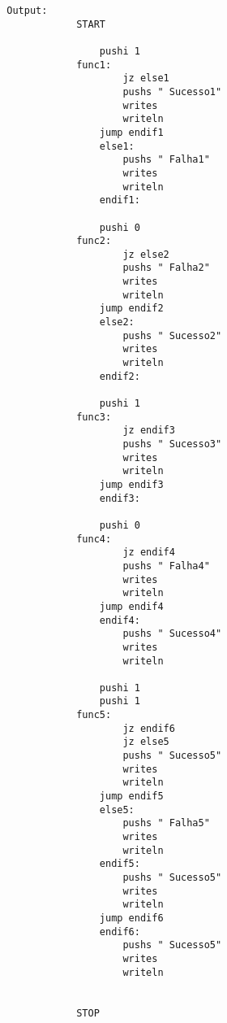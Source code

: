 \documentclass{article}
\begin{document}
        
        \begin{verbatim}
        Output: 			
                    START
                    
                    	pushi 1
                    func1:
                    		jz else1
                    		pushs " Sucesso1"
                    		writes 
                    		writeln 
                    	jump endif1
                    	else1:
                    		pushs " Falha1"
                    		writes 
                    		writeln 
                    	endif1:
                    	
                    	pushi 0
                    func2:
                    		jz else2
                    		pushs " Falha2"
                    		writes 
                    		writeln 
                    	jump endif2
                    	else2:
                    		pushs " Sucesso2"
                    		writes 
                    		writeln 
                    	endif2:
                    	
                    	pushi 1
                    func3:
                    		jz endif3
                    		pushs " Sucesso3"
                    		writes 
                    		writeln 
                    	jump endif3
                    	endif3:
                    	
                    	pushi 0
                    func4:
                    		jz endif4
                    		pushs " Falha4"
                    		writes 
                    		writeln 
                    	jump endif4
                    	endif4:
                    		pushs " Sucesso4"
                    		writes 
                    		writeln 
                    	
                    	pushi 1
                    	pushi 1
                    func5:
                    		jz endif6
                    		jz else5
                    		pushs " Sucesso5"
                    		writes 
                    		writeln 
                    	jump endif5
                    	else5:
                    		pushs " Falha5"
                    		writes 
                    		writeln 
                    	endif5:
                    		pushs " Sucesso5"
                    		writes 
                    		writeln 
                    	jump endif6
                    	endif6:
                    		pushs " Sucesso5"
                    		writes 
                    		writeln 
                    	
                    
                    STOP
        \end{verbatim}
        
\end{document}
